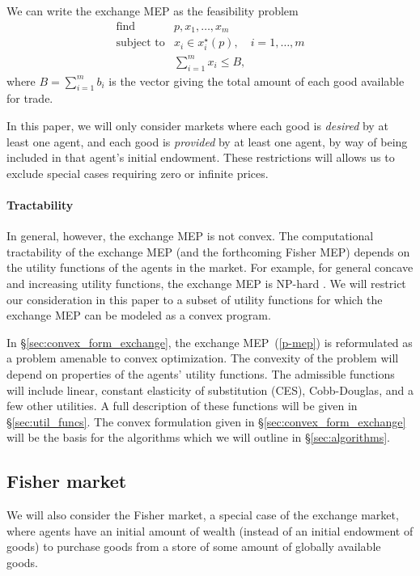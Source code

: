 \documentclass[12pt]{article}
\begin{document}
We can write the exchange MEP as the feasibility problem
\begin{equation}
\label{p-mep}
\begin{array}{ll}
\mbox{find} & p, x_1, \ldots, x_m \\
\mbox{subject to} & x_i \in x_i^\star(p),\quad i = 1,\ldots, m \\
& \sum_{i=1}^m x_i \leq B,
\end{array}
\end{equation}
where $B = \sum_{i=1}^m b_i$ is the vector giving the total amount of each good
available for trade.

In this paper, we will only consider markets where each good is \emph{desired}
by at least one agent, and each good is \emph{provided} by at least one agent,
by way of being included in that agent's initial endowment. These restrictions
will allows us to exclude special cases requiring zero or infinite prices.


\paragraph{Tractability}

In general, however, the exchange MEP is not convex. The computational
tractability of the exchange MEP (and the forthcoming Fisher MEP) depends on
the utility functions of the agents in the market. For example, for general
concave and increasing utility functions, the exchange MEP is NP-hard
\cite{codenotti2006leontief}. We will restrict our consideration in this paper
to a subset of utility functions for which the exchange MEP can be modeled as a
convex program.

In \S\ref{sec:convex_form_exchange}, the exchange MEP~(\ref{p-mep}) is
reformulated as a problem amenable to convex optimization. The convexity of the
problem will depend on properties of the agents' utility functions. The
admissible functions will include linear, constant elasticity of substitution
(CES), Cobb-Douglas, and a few other utilities. A full description of these
functions will be given in \S\ref{sec:util_funcs}. The convex formulation given
in \S\ref{sec:convex_form_exchange} will be the basis for the algorithms which
we will outline in \S\ref{sec:algorithms}.


\subsection{Fisher market}

We will also consider the Fisher market, a special case of the exchange market,
where agents have an initial amount of wealth (instead of an initial endowment
of goods) to purchase goods from a store of some amount of globally available
goods.
\end{document}
